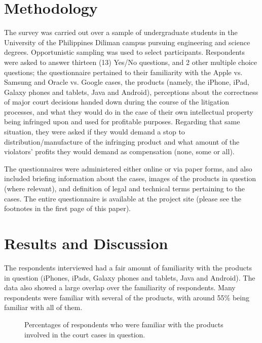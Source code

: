 \documentclass[prodmode,cs196]{acmlarge}
\begin{document}
\section{Methodology}

The survey was carried out over a sample of undergraduate students in the University of the Philippines Diliman campus pursuing engineering and science degrees. Opportunistic sampling was used to select participants. Respondents were asked to answer thirteen (13) Yes/No questions, and 2 other multiple choice questions; the questionnaire pertained to their familiarity with the Apple vs. Samsung and Oracle vs. Google cases, the products (namely, the iPhone, iPad, Galaxy phones and tablets, Java and Android), perceptions about the correctness of major court decisions handed down during the course of the litigation processes, and what they would do in the case of their own intellectual property being infringed upon and used for profitable purposes. Regarding that same situation, they were asked if they would demand a stop to distribution/manufacture of the infringing product and what amount of the violators' profits they would demand as compensation (none, some or all).

The questionnaires were administered either online or via paper forms, and also included briefing information about the cases, images of the products in question (where relevant), and definition of legal and technical terms pertaining to the cases. The entire questionnaire is available at the project site (please see the footnotes in the first page of this paper).

\section{Results and Discussion}

The respondents interviewed had a fair amount of familiarity with the products in question (iPhones, iPads, Galaxy phones and tablets, Java and Android). The data also showed a large overlap over the familiarity of respondents. Many respondents were familiar with several of the products, with around 55\% being familiar with all of them.

\begin{figure}[H]
	\begin{bchart}[min=0, step=10 ,max=100]
            \smallskip
            \smallskip
			\smallskip
    \end{bchart}
	\caption{Percentages of respondents who were familiar with the products involved in the court cases in question.}
\end{figure}
\end{document}
